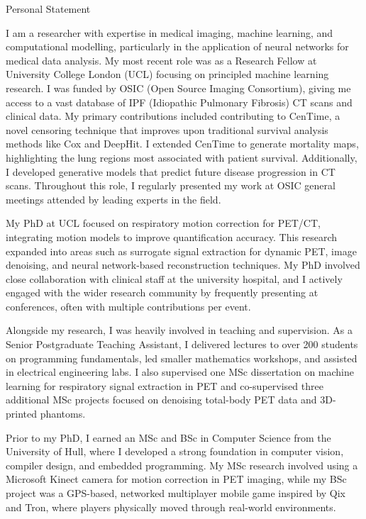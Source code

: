 \documentclass{cv}
\begin{document}
    \begin{rSection}{Personal Statement}
        \item I am a researcher with expertise in medical imaging, machine learning, and computational modelling, particularly in the application of neural networks for medical data analysis. My most recent role was as a Research Fellow at University College London (UCL) focusing on principled machine learning research. I was funded by OSIC (Open Source Imaging Consortium), giving me access to a vast database of IPF (Idiopathic Pulmonary Fibrosis) CT scans and clinical data. My primary contributions included contributing to CenTime, a novel censoring technique that improves upon traditional survival analysis methods like Cox and DeepHit. I extended CenTime to generate mortality maps, highlighting the lung regions most associated with patient survival. Additionally, I developed generative models that predict future disease progression in CT scans. Throughout this role, I regularly presented my work at OSIC general meetings attended by leading experts in the field.

        \item My PhD at UCL focused on respiratory motion correction for PET/CT, integrating motion models to improve quantification accuracy. This research expanded into areas such as surrogate signal extraction for dynamic PET, image denoising, and neural network-based reconstruction techniques. My PhD involved close collaboration with clinical staff at the university hospital, and I actively engaged with the wider research community by frequently presenting at conferences, often with multiple contributions per event.

        \item Alongside my research, I was heavily involved in teaching and supervision. As a Senior Postgraduate Teaching Assistant, I delivered lectures to over 200 students on programming fundamentals, led smaller mathematics workshops, and assisted in electrical engineering labs. I also supervised one MSc dissertation on machine learning for respiratory signal extraction in PET and co-supervised three additional MSc projects focused on denoising total-body PET data and 3D-printed phantoms.

        \item Prior to my PhD, I earned an MSc and BSc in Computer Science from the University of Hull, where I developed a strong foundation in computer vision, compiler design, and embedded programming. My MSc research involved using a Microsoft Kinect camera for motion correction in PET imaging, while my BSc project was a GPS-based, networked multiplayer mobile game inspired by Qix and Tron, where players physically moved through real-world environments.


\end{rSection}
\end{document}
